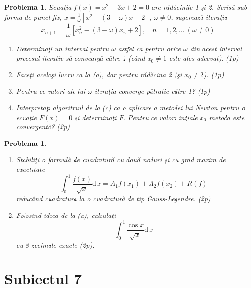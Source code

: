 \documentclass[12pt]{article}%
\newtheorem{problem}[theorem]{Problema}
\begin{document}
\begin{problem}
\label{Gautschip4.41}Ecua\c{t}ia $f(x)=x^{2}-3x+2=0$ are r\u{a}d\u{a}cinile 1
\c{s}i 2. Scris\u{a} sub forma de punct fix, $x=\frac{1}{\omega}\left[
x^{2}-\left(  3-\omega\right)  x+2\right]  $, $\omega\neq0$, sugereaz\u{a}
itera\c{t}ia%
\[
x_{n+1}=\frac{1}{\omega}\left[  x_{n}^{2}-\left(  3-\omega\right)
x_{n}+2\right]  ,\quad n=1,2,\dots~(\omega\neq0)
\]


\begin{enumerate}
\item[(a)] Determina\c{t}i un interval pentru $\omega$ astfel ca pentru orice
$\omega$ din acest interval procesul iterativ s\u{a} convearg\u{a} c\u{a}tre 1
(c\^{a}nd $x_{0}\neq1$ este ales adecvat). (1p)

\item[(b)] Face\c{t}i acela\c{s}i lucru ca la (a), dar pentru r\u{a}d\u{a}cina
2 (\c{s}i $x_{0}\neq2$). (1p)

\item[(c)] Pentru ce valori ale lui $\omega$ itera\c{t}ia converge
p\u{a}tratic c\u{a}tre 1? (1p)

\item[(d)] Interpreta\c{t}i algoritmul de la (c) ca o aplicare a metodei lui
Newton pentru o ecua\c{t}ie $F(x)=0$ \c{s}i determina\c{t}i $F$. Pentru ce
valori in\c{t}iale $x_{0}$ metoda este convergent\u{a}? (2p)
\end{enumerate}
\end{problem}

\begin{problem}


\begin{enumerate}
\item[(a)] Stabili\c{t}i o formul\u{a} de cuadratur\u{a} cu dou\u{a} noduri
\c{s}i cu grad maxim de exactitate
\[
\int_{0}^{1}\frac{f(x)}{\sqrt{x}}\mathrm{d}\,x=A_{1}f(x_{1})+A_{2}%
f(x_{2})+R(f)
\]
reduc\^{a}nd cuadratura la o cuadratur\u{a} de tip Gauss-Legendre. (2p)

\item[(b)] Folosind ideea de la (a), calcula\c{t}i
\[
\int_{0}^{1}\frac{\cos x}{\sqrt{x}}\mathrm{d}\,x
\]
cu 8 zecimale exacte (2p).
\end{enumerate}
\end{problem}



\section*{Subiectul 7}
\end{document}
